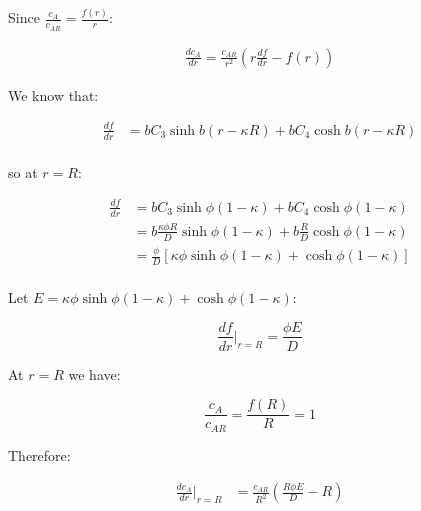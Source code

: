 \documentclass[letterpaper,12pt]{article}
\begin{document}
Since $\frac{c_A}{c_{AR}} = \frac{f(r)}{r}$:

\begin{equation}
\begin{aligned}
    \frac{d c_A}{d r} = \frac{c_{AR}}{r^2} \left( r \frac{df}{dr} - f(r) \right)
\end{aligned}
\end{equation}

We know that:

\begin{equation}
\begin{aligned}
    \frac{df}{dr} &= bC_3 \sinh{b(r - \kappa R)} + bC_4 \cosh{b(r - \kappa R)} \\
\end{aligned}
\end{equation}

so at $r = R$:

\begin{equation}
\begin{aligned}
    \frac{df}{dr} &= bC_3 \sinh{\phi(1 - \kappa)} + bC_4 \cosh{\phi(1 - \kappa)} \\
                  &= b \frac{\kappa \phi R}{D} \sinh{\phi(1 - \kappa)} + b \frac{R}{D} \cosh{\phi(1 - \kappa)} \\
                  &= \frac{\phi}{D} \left[ \kappa \phi \sinh{\phi(1 - \kappa)} + \cosh{\phi(1 - \kappa)} \right]\\
\end{aligned}
\end{equation}

Let $E = \kappa \phi \sinh{\phi(1 - \kappa)} + \cosh{\phi(1 - \kappa)} $:

\begin{equation}
    \frac{df}{dr} \bigg|_{r=R} = \frac{\phi E}{D}
\end{equation}

At $r = R$ we have:

\begin{equation}
    \frac{c_A}{c_{AR}} = \frac{f(R)}{R} = 1
\end{equation}

Therefore:

\begin{equation}
\begin{aligned}
    \frac{d c_A}{d r} \bigg|_{r=R} &= \frac{c_{AR}}{R^2} \left( \frac{R \phi E}{D} - R \right)
\end{aligned}
\end{equation}
\end{document}
